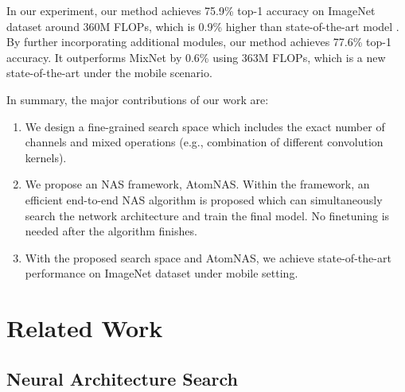 \documentclass{article} \usepackage{iclr2020_conference,times}
\newcommand{\flops}{FLOPs\xspace}
\begin{document}
In our experiment, our method achieves 75.9\% top-1 accuracy on ImageNet dataset around 360M \flops, which is 0.9\% higher than state-of-the-art model \citep{stamoulis2019single_path}. By further incorporating additional modules, our method achieves 77.6\% top-1 accuracy. It outperforms MixNet by 0.6\% using 363M \flops, which is a new state-of-the-art under the mobile scenario.

In summary, the major contributions of our work are:
\begin{enumerate}
    \item We design a fine-grained search space which includes the exact number of channels and mixed operations (e.g., combination of different convolution kernels).
    \item We propose an NAS framework, AtomNAS. Within the framework, an efficient end-to-end NAS algorithm is proposed which can simultaneously search the network architecture and train the final model. No finetuning is needed after the algorithm finishes.
\item With the proposed search space and AtomNAS, we achieve state-of-the-art performance on ImageNet dataset under mobile setting.
\end{enumerate}


















\section{Related Work}

\subsection{Neural Architecture Search}
\end{document}
